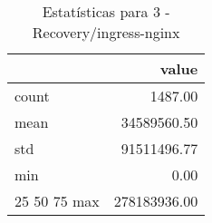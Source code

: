 \begin{table}[htbp]
\caption{Estatísticas para 3 - Recovery/ingress-nginx}
\label{tab:3_-_recovery_ingress-nginx_summary}
\begin{tabular}{lr}
\toprule
 & value \\
\midrule
count & 1487.00 \\
mean & 34589560.50 \\
std & 91511496.77 \\
min & 0.00 \\
25%
50%
75%
max & 278183936.00 \\
\bottomrule
\end{tabular}
\end{table}
